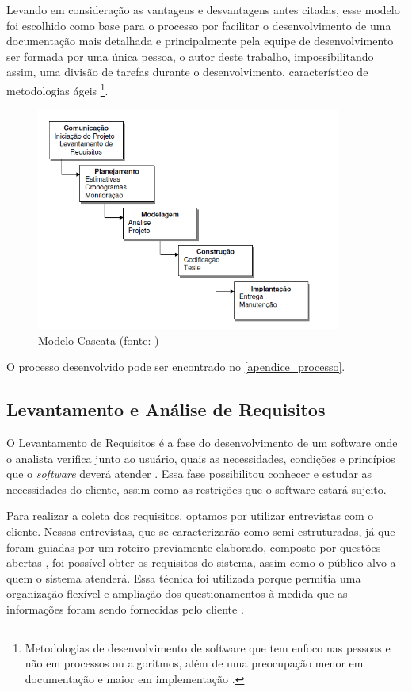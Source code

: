 Levando em consideração as vantagens e desvantagens antes citadas, esse modelo foi escolhido como base para o processo por facilitar o desenvolvimento de uma documentação mais detalhada e principalmente pela equipe de desenvolvimento ser formada por uma única pessoa, o autor deste trabalho, impossibilitando assim, uma divisão de tarefas durante o desenvolvimento, característico de metodologias ágeis \footnote{Metodologias de desenvolvimento de software que tem enfoco nas pessoas e não em processos ou algoritmos, além de uma preocupação menor em documentação e maior em implementação \cite{michel2004metodologias}.}.

\begin{figure}[H]
\centering
\includegraphics[width=10cm]{figuras/figura_ciclo_cascata}
\caption{Modelo Cascata (fonte:   )}
\label{figura_ciclo_cascata}
\end{figure}

O processo desenvolvido pode ser encontrado no \autoref{apendice_processo}.

\subsection{Levantamento e Análise de Requisitos}


O Levantamento de Requisitos é a fase do desenvolvimento de um software onde o analista verifica junto ao usuário, quais as necessidades, condições e princípios que o \textit{software} deverá atender \cite{matuda2013mapas}. Essa fase possibilitou conhecer e estudar as necessidades do cliente, assim como as restrições que o software estará sujeito.

Para realizar a coleta dos requisitos, optamos por utilizar entrevistas com o cliente. Nessas entrevistas, que se caracterizarão como semi-estruturadas, já que foram guiadas por um roteiro previamente elaborado, composto por questões abertas \cite{belei2008uso}, foi possível obter os requisitos do sistema, assim como o público-alvo a quem o sistema atenderá. Essa técnica foi utilizada porque permitia uma organização flexível e ampliação dos questionamentos à medida que as informações foram sendo fornecidas pelo cliente \cite{fujisawa2000utilizaccao}.

